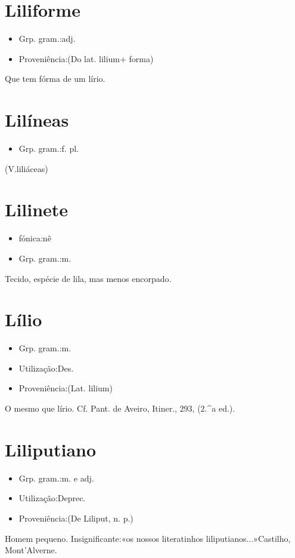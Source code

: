 \section{Liliforme}
\begin{itemize}
\item {Grp. gram.:adj.}
\end{itemize}
\begin{itemize}
\item {Proveniência:(Do lat. \textunderscore lilium\textunderscore  + \textunderscore forma\textunderscore )}
\end{itemize}
Que tem fórma de um lírio.
\section{Lilíneas}
\begin{itemize}
\item {Grp. gram.:f. pl.}
\end{itemize}
(V.liliáceas)
\section{Lilinete}
\begin{itemize}
\item {fónica:nê}
\end{itemize}
\begin{itemize}
\item {Grp. gram.:m.}
\end{itemize}
Tecido, espécie de lila, mas menos encorpado.
\section{Lílio}
\begin{itemize}
\item {Grp. gram.:m.}
\end{itemize}
\begin{itemize}
\item {Utilização:Des.}
\end{itemize}
\begin{itemize}
\item {Proveniência:(Lat. \textunderscore lilium\textunderscore )}
\end{itemize}
O mesmo que \textunderscore lírio\textunderscore . Cf. Pant. de Aveiro, \textunderscore Itiner.\textunderscore , 293, (2.^a ed.).
\section{Liliputiano}
\begin{itemize}
\item {Grp. gram.:m.  e  adj.}
\end{itemize}
\begin{itemize}
\item {Utilização:Deprec.}
\end{itemize}
\begin{itemize}
\item {Proveniência:(De \textunderscore Liliput\textunderscore , n. p.)}
\end{itemize}
Homem pequeno.
Insignificante:«\textunderscore os nossos literatinhos liliputianos...\textunderscore »Castilho, \textunderscore Mont'Alverne\textunderscore .
